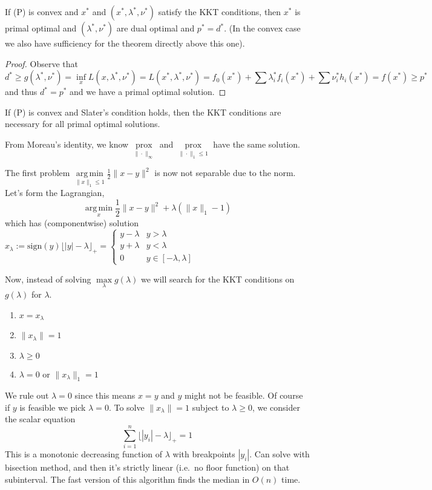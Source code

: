 \documentclass[english, 11pt]{article}
\DeclareMathOperator*{\argmin}{arg\,min}
\DeclareMathOperator*{\prox}{prox}
\begin{document}
  \begin{thrm}
  If (P) is convex and $x^*$ and $(x^*,\lambda^*, \nu^*)$ satisfy the KKT conditions, then $x^*$ is primal optimal and $(\lambda^*,\nu^*)$ are dual optimal and $p^*=d^*$. (In the convex case we also have sufficiency for the theorem directly above this one).
  \end{thrm}
  
  \begin{proof}
  Observe that
  \[
  d^*  \ge g(\lambda^*,\nu^*) = \inf \limits_x L(x,\lambda^*,\nu^*)= L(x^*,\lambda^*,\nu^*) = 
f_0(x^*) + \sum \lambda_i^* f_i(x^*) + \sum \nu^*_i h_i(x^*)  = f(x^*) \ge p^*
\]
and thus $d^* = p^*$ and we have a primal optimal solution.
  \end{proof}
  
  \begin{thrm}
 If (P) is convex and Slater's condition holds, then the KKT conditions are necessary for all primal optimal solutions.
  \end{thrm}
  
  
  
  \begin{exmp}
  From Moreau's identity, we know $\prox \limits_{\| \cdot \|_\infty}$ and $\prox \limits_{ \|\cdot\|_1 \le 1}$ have the same solution.
  
  The first problem $\argmin \limits_{\|x\|_1 \le 1} \frac{1}{2} \|x-y\|^2$ is now not separable due to the norm. Let's form the Lagrangian,
  \[
  \argmin \limits_{x} \frac{1}{2} \|x-y\|^2 + \lambda( \|x\|_1-1)
  \]
  which has (componentwise) solution $x_\lambda := \text{sign}(y) \lfloor |y|- \lambda \rfloor_+= \begin{cases} y-\lambda& y>\lambda \\ y+\lambda & y<\lambda \\ 0 & y \in [-\lambda,\lambda] \end{cases}$
  
  Now, instead of solving $\max \limits_\lambda g(\lambda) $ we will search for the KKT conditions on $g(\lambda)$ for $\lambda$.
  
  \begin{enumerate}
  \item $x = x_\lambda$
  \item $\|x_\lambda\|=1$
  \item $\lambda \ge 0$
  \item $\lambda=0$ or $\|x_\lambda\|_1=1$
  \end{enumerate}  \end{exmp}
  We rule out $\lambda =0$ since this means $x=y$ and $y$ might not be feasible. Of course if $y$ is feasible we pick $\lambda=0$. To solve $\|x_\lambda \|=1$ subject to $\lambda \ge 0$, we consider the scalar equation
  \[
  \sum_{i=1}^n \lfloor |y_i|-\lambda \rfloor_+ =1
  \]
  This is a monotonic decreasing function of $\lambda$ with breakpoints $|y_i|$. Can solve with bisection method, and then it's strictly linear (i.e.\ no floor function) on that subinterval. The fast version of this algorithm finds the median in $O(n)$ time.
  
\end{document}

